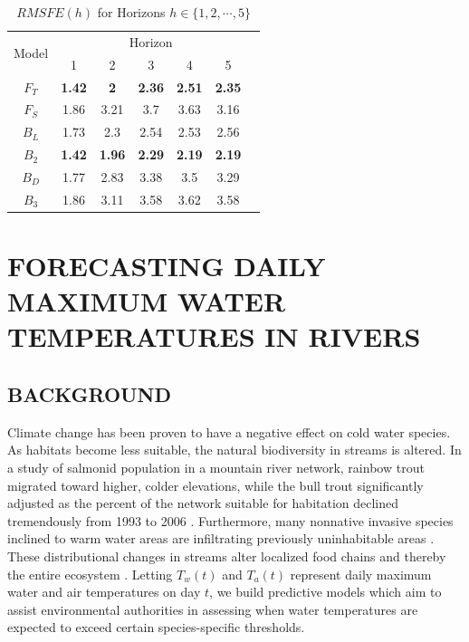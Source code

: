 \begin{table}[!h]
\footnotesize
  \centering
  \caption{$RMSFE(h)$ for Horizons $h \in \{1,2,\cdots,5\}$}
    \begin{tabular}{ccccccc}
    \toprule
     \multirow{2}[0]{*}{Model} & \multicolumn{5}{c}{Horizon} \\
                 & 1    & 2    & 3    & 4    & 5 \\
         \midrule
     $F_T$ &  {\bf 1.42} &  {\bf2}    &  {\bf2.36} &  {\bf2.51} & {\bf2.35} \\
            $F_S$ & 1.86 & 3.21 & 3.7  & 3.63 & 3.16 \\
         \midrule
       $B_L$ & 1.73 & 2.3  & 2.54 & 2.53 & 2.56 \\
        $B_2$ & {\bf 1.42} & {\bf1.96} &  {\bf2.29} &  {\bf2.19} & {\bf2.19} \\
         $B_D$ & 1.77 & 2.83 & 3.38 & 3.5  & 3.29 \\
          $B_3$ & 1.86 & 3.11 & 3.58 & 3.62 & 3.58 \\
    \bottomrule
    \end{tabular}%
  \label{tab:ssrmsfe}%
\end{table}%


\section{FORECASTING DAILY MAXIMUM WATER TEMPERATURES IN RIVERS}

\subsection{BACKGROUND}

Climate change has been proven to have a negative effect on cold water species. As habitats become less suitable, the natural biodiversity in streams is altered. In a study of salmonid population in a mountain river network, rainbow trout migrated toward higher, colder elevations, while the bull trout significantly adjusted as the percent of the network suitable for habitation declined tremendously from 1993 to 2006 \citep{Isaak2010}. Furthermore, many nonnative invasive species inclined to warm water areas are infiltrating previously uninhabitable areas \citep{Rahel2008}. These distributional changes in streams alter localized food chains and thereby the entire ecosystem \citep{Albouy2014}. Letting $T_w(t)$ and $T_a(t)$ represent daily maximum water and air temperatures on day $t$, we build predictive models which aim to assist environmental authorities in assessing when water temperatures are expected to exceed certain species-specific thresholds.

